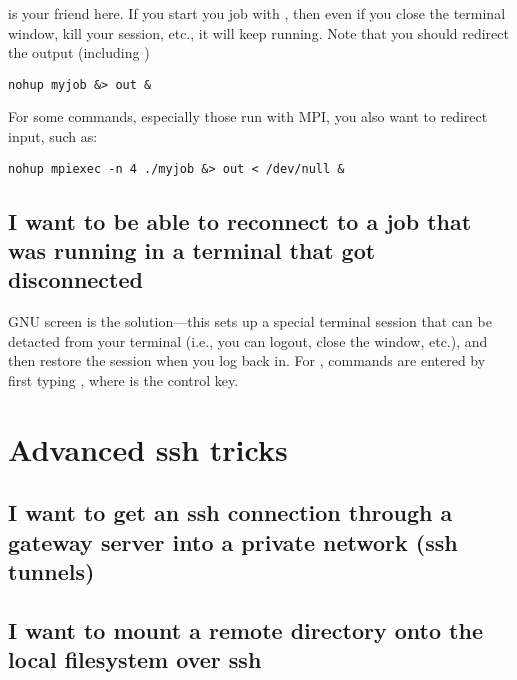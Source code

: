  is your friend here. If you start you job with , then
even if you close the terminal window, kill your  session, etc., it
will keep running. Note that you should redirect the output (including
)

\begin{lstlisting}
nohup myjob &> out &
\end{lstlisting}

For some commands, especially those run with MPI, you also want to redirect
input, such as:

\begin{lstlisting}
nohup mpiexec -n 4 ./myjob &> out < /dev/null &
\end{lstlisting}

\subsection{I want to be able to reconnect to a job that was running in a
terminal that got disconnected}

GNU screen is the solution---this sets up a special terminal session that can
be detacted from your terminal (i.e., you can logout, close the window, etc.),
and then restore the session when you log back in. For , commands
are entered by first typing , where \cmd{^} is the control key.

\section{Advanced ssh tricks}

\subsection{I want to get an ssh connection through a gateway server into a
private network (ssh tunnels)}

\subsection{I want to mount a remote directory onto the local filesystem over
ssh}

